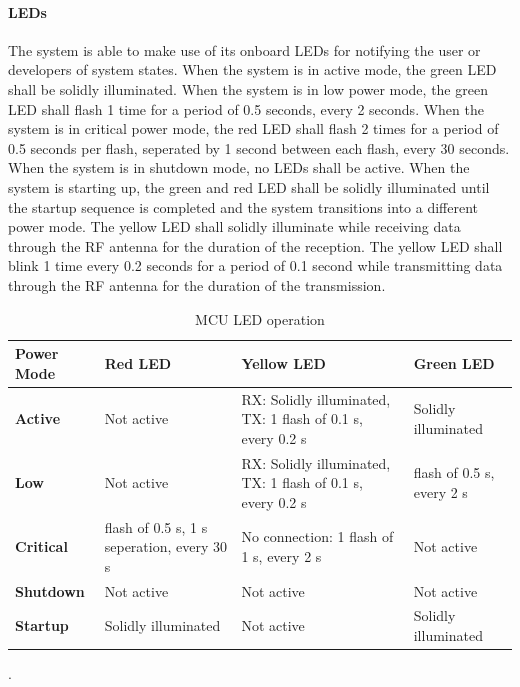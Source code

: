 \paragraph{LEDs} The system is able to make use of its onboard LEDs for notifying the user or developers of system states. When the system is in active mode, the green LED shall be solidly illuminated. When the system is in low power mode, the green LED shall flash 1 time for a period of 0.5 seconds, every 2 seconds. When the system is in critical power mode, the red LED shall flash 2 times for a period of 0.5 seconds per flash, seperated by 1 second between each flash, every 30 seconds. When the system is in shutdown mode, no LEDs shall be active. When the system is starting up, the green and red LED shall be solidly illuminated until the startup sequence is completed and the system transitions into a different power mode. The yellow LED shall solidly illuminate while receiving data through the RF antenna for
the duration of the reception. The yellow LED shall blink 1 time every 0.2 seconds for a period of 0.1 second while transmitting data through the RF antenna for the duration of the transmission.

\begin{table}
	\centering
	\begin{tabularx}{\textwidth}
		{
			| >{\raggedright\arraybackslash}X
			| >{\raggedright\arraybackslash}X
			| >{\raggedright\arraybackslash}X
			| >{\raggedright\arraybackslash}X
			|
		}
		\caption{MCU LED operation}
		\label{table:mcu_leds} \\
		\hline
		\textbf{Power Mode} & \textbf{Red LED} & \textbf{Yellow LED} & \textbf{Green LED} \\
		\hline
        \textbf{Active} & Not active & RX: Solidly illuminated, TX: 1 flash of 0.1 s, every 0.2 s & Solidly illuminated \\
        \hline
        \textbf{Low} & Not active & RX: Solidly illuminated, TX: 1 flash of 0.1 s, every 0.2 s & 1 flash of 0.5 s, every 2 s \\
        \hline
        \textbf{Critical} & 2 flash of 0.5 s, 1 s seperation, every 30 s & No connection: 1 flash of 1 s, every 2 s & Not active \\
        \hline
        \textbf{Shutdown} & Not active & Not active & Not active \\
        \hline
        \textbf{Startup} & Solidly illuminated & Not active & Solidly illuminated \\
        \hline
	\end{tabularx}
\end{table}
.

